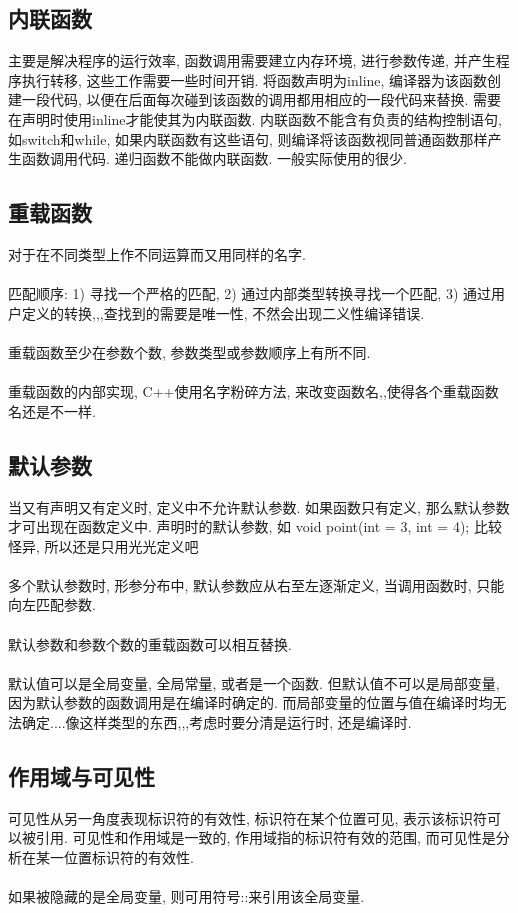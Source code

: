 \documentclass[a4paper,10pt,english]{article}
\begin{document}
\subsection {内联函数}
主要是解决程序的运行效率, 函数调用需要建立内存环境, 进行参数传递, 并产生程序执行转移, 这些工作需要一些时间开销. 将函数声明为inline, 编译器为该函数创建一段代码, 以便在后面每次碰到该函数的调用都用相应的一段代码来替换. 需要在声明时使用inline才能使其为内联函数. 内联函数不能含有负责的结构控制语句, 如switch和while, 如果内联函数有这些语句, 则编译将该函数视同普通函数那样产生函数调用代码. 递归函数不能做内联函数. 一般实际使用的很少.

\subsection {重载函数}
对于在不同类型上作不同运算而又用同样的名字. \\\\
匹配顺序: 1) 寻找一个严格的匹配, 2) 通过内部类型转换寻找一个匹配, 3) 通过用户定义的转换,,,查找到的需要是唯一性, 不然会出现二义性编译错误. \\\\
重载函数至少在参数个数, 参数类型或参数顺序上有所不同.\\\\
重载函数的内部实现, C++使用名字粉碎方法, 来改变函数名,,使得各个重载函数名还是不一样.\\

\subsection {默认参数}
当又有声明又有定义时, 定义中不允许默认参数. 如果函数只有定义, 那么默认参数才可出现在函数定义中. 声明时的默认参数, 如 void point(int = 3, int = 4); 比较怪异, 所以还是只用光光定义吧\\\\
多个默认参数时, 形参分布中, 默认参数应从右至左逐渐定义, 当调用函数时, 只能向左匹配参数. \\\\
默认参数和参数个数的重载函数可以相互替换. \\\\
默认值可以是全局变量, 全局常量, 或者是一个函数. 但默认值不可以是局部变量, 因为默认参数的函数调用是在编译时确定的. 而局部变量的位置与值在编译时均无法确定....像这样类型的东西,,,考虑时要分清是运行时, 还是编译时.

\subsection {作用域与可见性}
可见性从另一角度表现标识符的有效性, 标识符在某个位置可见, 表示该标识符可以被引用. 可见性和作用域是一致的, 作用域指的标识符有效的范围, 而可见性是分析在某一位置标识符的有效性.\\\\
如果被隐藏的是全局变量, 则可用符号::来引用该全局变量.
\end{document}

